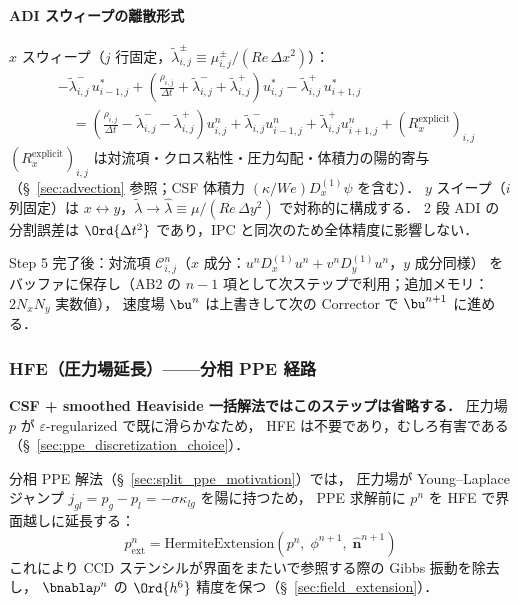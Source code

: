 \paragraph{ADI スウィープの離散形式}

$x$ スウィープ（$j$ 行固定，$\tilde\lambda^\pm_{i,j} \equiv \mu^\pm_{i,j}/(Re\,\Delta x^2)$）：
\begin{equation*}
\begin{split}
  &-\tilde\lambda^-_{i,j}\,u^*_{i-1,j}
  + \!\left(\frac{\rho_{i,j}}{\Delta t} + \tilde\lambda^-_{i,j} + \tilde\lambda^+_{i,j}\right)\!u^*_{i,j}
  - \tilde\lambda^+_{i,j}\,u^*_{i+1,j} \\
  &\quad= \left(\frac{\rho_{i,j}}{\Delta t} - \tilde\lambda^-_{i,j} - \tilde\lambda^+_{i,j}\right)u^n_{i,j}
  + \tilde\lambda^-_{i,j} u^n_{i-1,j}
  + \tilde\lambda^+_{i,j} u^n_{i+1,j}
  + (R^{\text{explicit}}_x)_{i,j}
\end{split}
\end{equation*}
$(R^{\text{explicit}}_x)_{i,j}$ は対流項・クロス粘性・圧力勾配・体積力の陽的寄与
（§~\ref{sec:advection} 参照；CSF 体積力 $(\kappa/We)D_x^{(1)}\psi$ を含む）．
$y$ スイープ（$i$ 列固定）は $x \leftrightarrow y$，$\tilde\lambda \to \hat\lambda \equiv \mu/(Re\,\Delta y^2)$ で対称的に構成する．
2 段 ADI の分割誤差は $\Ord{\Delta t^2}$ であり，IPC と同次のため全体精度に影響しない．

Step 5 完了後：対流項 $\mathcal{C}^n_{i,j}$（$x$ 成分：$u^n D_x^{(1)}u^n + v^n D_y^{(1)}u^n$，$y$ 成分同様）
をバッファに保存し（AB2 の $n-1$ 項として次ステップで利用；追加メモリ：$2N_xN_y$ 実数値），
速度場 $\bu^n$ は上書きして次の Corrector で $\bu^{n+1}$ に進める．

\subsubsection{HFE（圧力場延長）——分相 PPE 経路}
\label{app:hfe_predictor}

\noindent\textbf{CSF + smoothed Heaviside 一括解法ではこのステップは省略する．}
圧力場 $p$ が $\varepsilon$-regularized で既に滑らかなため，
HFE は不要であり，むしろ有害である（§~\ref{sec:ppe_discretization_choice}）．

分相 PPE 解法（§~\ref{sec:split_ppe_motivation}）では，
圧力場が Young--Laplace ジャンプ $j_{gl}=p_g-p_l=-\sigma\kappa_{lg}$ を陽に持つため，
PPE 求解前に $p^n$ を HFE で界面越しに延長する：
\[
  p^n_{\mathrm{ext}} = \text{HermiteExtension}(p^n,\; \phi^{n+1},\; \hat{\bm{n}}^{n+1})
\]
これにより CCD ステンシルが界面をまたいで参照する際の Gibbs 振動を除去し，
$\bnabla p^n$ の $\Ord{h^6}$ 精度を保つ（§~\ref{sec:field_extension}）．

